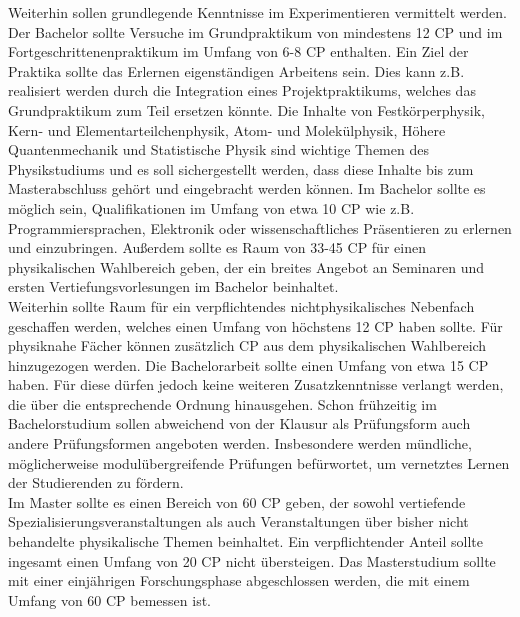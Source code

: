         Weiterhin sollen grundlegende Kenntnisse im Experimentieren vermittelt werden. Der Bachelor sollte Versuche im Grundpraktikum von mindestens 12 CP und im Fortgeschrittenenpraktikum im Umfang von 6-8 CP enthalten. Ein Ziel der Praktika sollte das Erlernen eigenständigen Arbeitens sein. Dies kann z.B. realisiert werden durch die Integration eines Projektpraktikums, welches das Grundpraktikum zum Teil ersetzen könnte.
        Die Inhalte von Festkörperphysik, Kern- und Elementarteilchenphysik, Atom- und Molekülphysik, Höhere Quantenmechanik und Statistische Physik sind wichtige Themen des Physikstudiums und es soll sichergestellt werden, dass diese Inhalte bis zum Masterabschluss gehört und eingebracht werden können.
        Im Bachelor sollte es möglich sein, Qualifikationen im Umfang von etwa 10 CP wie z.B. Programmiersprachen, Elektronik oder wissenschaftliches Präsentieren zu erlernen und einzubringen. Außerdem sollte es Raum von 33-45 CP für einen physikalischen Wahlbereich geben, der ein breites Angebot an Seminaren und ersten Vertiefungsvorlesungen im Bachelor beinhaltet.\\
        Weiterhin sollte Raum für ein verpflichtendes nichtphysikalisches Nebenfach geschaffen werden, welches einen Umfang von höchstens 12 CP haben sollte. Für physiknahe Fächer können zusätzlich CP aus dem physikalischen Wahlbereich hinzugezogen werden.
        Die Bachelorarbeit sollte einen Umfang von etwa 15 CP haben. Für diese dürfen jedoch keine weiteren Zusatzkenntnisse verlangt werden, die über die entsprechende Ordnung hinausgehen.
        Schon frühzeitig im Bachelorstudium sollen abweichend von der Klausur als Prüfungsform auch andere Prüfungsformen angeboten werden. Insbesondere werden mündliche, möglicherweise modulübergreifende Prüfungen befürwortet, um vernetztes Lernen der Studierenden zu fördern.\\
        Im Master sollte es einen Bereich von 60 CP geben, der sowohl vertiefende Spezialisierungsveranstaltungen als auch Veranstaltungen über bisher nicht behandelte physikalische Themen beinhaltet. Ein verpflichtender Anteil sollte ingesamt einen Umfang von 20 CP nicht übersteigen.
        Das Masterstudium sollte mit einer einjährigen Forschungsphase abgeschlossen werden, die mit einem Umfang von 60 CP bemessen ist.
